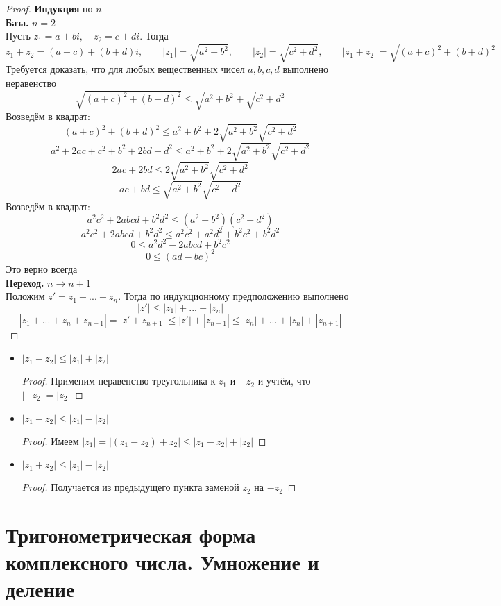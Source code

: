 \begin{proof}
	\textbf{Индукция} по $n$ \\
	\textbf{База.} $n = 2$ \\
	Пусть $z_1 = a + bi, \quad z_2 = c + di$. Тогда
	$$ z_1 + z_2 = (a + c) + (b + d)i, \qquad |z_1| = \sqrt{a^2 + b^2}, \qquad |z_2| = \sqrt{c^2 + d^2}, \qquad |z_1 + z_2| = \sqrt{(a + c)^2 + (b + d)^2} $$
	Требуется доказать, что для любых вещественных чисел $a, b, c, d$ выполнено неравенство
	$$ \sqrt{(a + c)^2 + (b + d)^2} \le \sqrt{a^2 + b^2} + \sqrt{c^2 + d^2} $$
	Возведём в квадрат:
	$$ (a + c)^2 + (b + d)^2 \le a^2 + b^2 + 2\sqrt{a^2 + b^2}\sqrt{c^2 + d^2} $$
	$$ a^2 + 2ac + c^2 + b^2 + 2bd + d^2 \le a^2 + b^2 + 2\sqrt{a^2 + b^2}\sqrt{c^2 + d^2} $$
	$$ 2ac + 2bd \le 2\sqrt{a^2 + b^2}\sqrt{c^2 + d^2} $$
	$$ ac + bd \le \sqrt{a^2 + b^2}\sqrt{c^2 + d^2} $$
	Возведём в квадрат:
	$$ a^2c^2 + 2abcd + b^2d^2 \le (a^2 + b^2)(c^2 + d^2) $$
	$$ a^2c^2 + 2abcd + b^2d^2 \le a^2c^2 + a^2d^2 + b^2c^2 + b^2d^2 $$
	$$ 0 \le a^2d^2 - 2abcd + b^2c^2 $$
	$$ 0 \le (ad - bc)^2 $$
	Это верно всегда \\
	\textbf{Переход.} $n \to n + 1$ \\
	Положим $z' = z_1 + ... + z_n$. Тогда по индукционному предположению выполнено
	$$ |z'| \le |z_1| + ... + |z_n| $$
	$$ |z_1 + ... + z_n + z_{n + 1}| = |z' + z_{n + 1}| \le |z'| + |z_{n + 1}| \le |z_n| + ... + |z_n| + |z_{n + 1}| $$
\end{proof}

\begin{implication}
	\hfill
	\begin{itemize}
		\item $|z_1 - z_2| \le |z_1| + |z_2|$
		\begin{proof}
			Применим неравенство треугольника к $z_1$ и $-z_2$ и учтём, что $|-z_2| = |z_2|$
		\end{proof}
		\item $|z_1 - z_2| \le |z_1| - |z_2|$
		\begin{proof}
			Имеем $ |z_1| = |(z_1 - z_2) + z_2| \le |z_1 - z_2| + |z_2| $
		\end{proof}
		\item $|z_1 + z_2| \le |z_1| - |z_2|$
		\begin{proof}
			Получается из предыдущего пункта заменой $z_2$ на $-z_2$
		\end{proof}
	\end{itemize}
\end{implication}

\section{Тригонометрическая форма комплексного числа. Умножение и деление}

